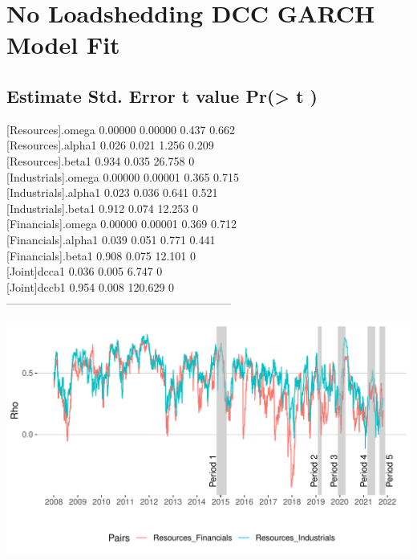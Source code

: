 \documentclass[11pt,preprint, authoryear]{elsarticle}
\let\origfigure\figure
\let\endorigfigure\endfigure
\renewenvironment{figure}[1][2] {
    \expandafter\origfigure\expandafter[H]
} {
    \endorigfigure
}
\numberwithin{equation}{section}
\numberwithin{figure}{section}
\numberwithin{table}{section}
\begin{document}
\hypertarget{no-loadshedding-dcc-garch-model-fit}{%
\section{No Loadshedding DCC GARCH Model
Fit}\label{no-loadshedding-dcc-garch-model-fit}}

\hypertarget{estimate-std.-error-t-value-pr-t-2}{%
\subsection{Estimate Std. Error t value Pr(\textgreater{} \textbar{}
t\textbar{} )}\label{estimate-std.-error-t-value-pr-t-2}}

{[}Resources{]}.omega 0.00000 0.00000 0.437 0.662\\
{[}Resources{]}.alpha1 0.026 0.021 1.256 0.209\\
{[}Resources{]}.beta1 0.934 0.035 26.758 0\\
{[}Industrials{]}.omega 0.00000 0.00001 0.365 0.715\\
{[}Industrials{]}.alpha1 0.023 0.036 0.641 0.521\\
{[}Industrials{]}.beta1 0.912 0.074 12.253 0\\
{[}Financials{]}.omega 0.00000 0.00001 0.369 0.712\\
{[}Financials{]}.alpha1 0.039 0.051 0.771 0.441\\
{[}Financials{]}.beta1 0.908 0.075 12.101 0\\
{[}Joint{]}dcca1 0.036 0.005 6.747 0\\
{[}Joint{]}dccb1 0.954 0.008 120.629 0\\
------------------------------------------------------------

\begin{figure}[H]

{\centering \includegraphics{Paper_files/figure-latex/DCCfullr-1} 

}

\caption{Dynamic Conditional Correlations: Resources \label{DCCfullr}}\label{fig:DCCfullr}
\end{figure}
\end{document}

